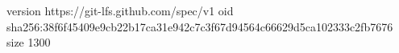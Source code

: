 version https://git-lfs.github.com/spec/v1
oid sha256:38f6f45409e9cb22b17ca31e942c7c3f67d94564c66629d5ca102333c2fb7676
size 1300
